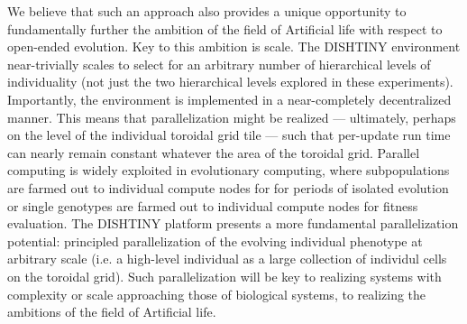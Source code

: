 We believe that such an approach also provides a unique opportunity to fundamentally further the ambition of the field of Artificial life with respect to open-ended evolution.
Key to this ambition is scale.
The DISHTINY environment near-trivially scales to select for an arbitrary number of hierarchical levels of individuality (not just the two hierarchical levels explored in these experiments).
Importantly, the environment is implemented in a near-completely decentralized manner.
This means that parallelization might be realized --- ultimately, perhaps on the level of the individual toroidal grid tile --- such that per-update run time can nearly remain constant whatever the area of the toroidal grid.
Parallel computing is widely exploited in evolutionary computing, where subpopulations are farmed out to individual compute nodes for for periods of isolated evolution or single genotypes are farmed out to individual compute nodes for fitness evaluation.
The DISHTINY platform presents a more fundamental parallelization potential: principled parallelization of the evolving individual phenotype at arbitrary scale (i.e. a high-level individual as a large collection of individul cells on the toroidal grid).
Such parallelization will be key to realizing systems with complexity or scale approaching those of biological systems, to realizing the ambitions of the field of Artificial life.

